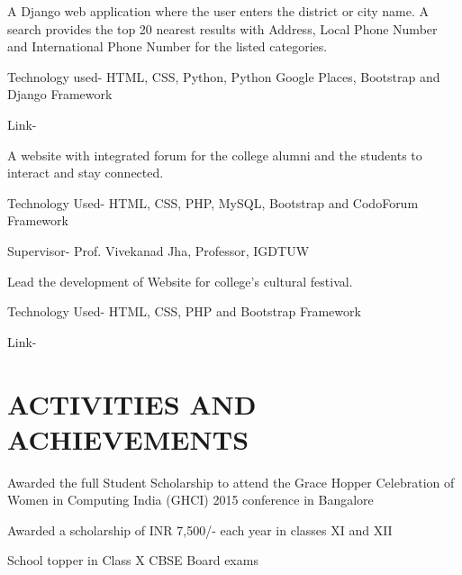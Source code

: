 \documentclass[]{resume-openfont}
\begin{document}
\begin{minipage}[t]{0.66\textwidth}
A Django web application where the user enters the district or city name. A search provides the top 20 nearest results with Address, Local Phone Number and International Phone Number for the listed categories. 
\begin{tightemize}
\item Technology used- HTML, CSS, Python, Python Google Places, Bootstrap and Django Framework
\item Link- \href{https://find-my-perfect-place.herokuapp.com/}{}
\end{tightemize}
\sectionsep

A website with integrated forum for the college alumni and the students to interact and stay connected.
\begin{tightemize}
\item Technology Used- HTML, CSS, PHP, MySQL, Bootstrap and CodoForum Framework
\item Supervisor- Prof. Vivekanad Jha, Professor, IGDTUW
\end{tightemize}
\sectionsep

Lead the development of Website for college’s cultural festival. 
\begin{tightemize}
\item Technology Used- HTML, CSS, PHP and Bootstrap Framework
\item Link- \href{http://www.taarangana.com/}{}
\end{tightemize}

\sectionsep


\section{ACTIVITIES AND ACHIEVEMENTS}

\begin{tightemize}
\item Awarded the full Student Scholarship to attend the Grace Hopper Celebration of Women in Computing India (GHCI) 2015 conference in Bangalore
\item Awarded a scholarship of INR 7,500/-  each year in classes XI and XII
\item School topper in Class X CBSE Board exams
\end{tightemize}
\sectionsep


\end{minipage}
\end{document}
